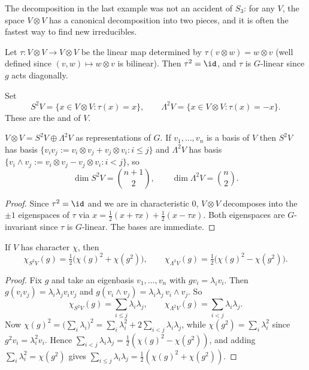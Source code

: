 The decomposition in the last example was not an accident of $S_3$: for any $V$, the space $V\otimes V$ has a canonical decomposition into two pieces, and it is often the fastest way to find new irreducibles.

Let $\tau : V\otimes V \to V\otimes V$ be the linear map determined by $\tau(v\otimes w) = w\otimes v$ (well defined since $(v,w)\mapsto w\otimes v$ is bilinear). Then $\tau^2 = \id$, and $\tau$ is $G$-linear since $g$ acts diagonally.

\begin{definition}
	Set
	$$S^2V = \{x \in V\otimes V : \tau(x) = x\}, \qquad \Lambda^2V = \{x\in V\otimes V: \tau(x) = -x\}.$$
	These are the  and  of $V$.
\end{definition}

\begin{proposition}
	$V \otimes V = S^2V\oplus\Lambda^2V$ as representations of $G$. If $v_1,\dots,v_n$ is a basis of $V$ then $S^2V$ has basis $\{v_iv_j := v_i\otimes v_j + v_j\otimes v_i : i\leq j\}$ and $\Lambda^2V$ has basis $\{v_i\wedge v_j := v_i\otimes v_j - v_j\otimes v_i : i<j\}$, so
	$$\dim S^2 V = \binom{n+1}2, \qquad \dim\Lambda^2V = \binom n2.$$
\end{proposition}
\begin{proof}
	Since $\tau^2 = \id$ and we are in characteristic $0$, $V\otimes V$ decomposes into the $\pm1$ eigenspaces of $\tau$ via $x = \frac12(x+\tau x) + \frac12(x - \tau x)$. Both eigenspaces are $G$-invariant since $\tau$ is $G$-linear. The bases are immediate.
\end{proof}

\begin{proposition}
	If $V$ has character $\chi$, then
	$$\chi_{S^2V}(g) = \tfrac12\big(\chi(g)^2 + \chi(g^2)\big), \qquad \chi_{\Lambda^2V}(g) = \tfrac12\big(\chi(g)^2 - \chi(g^2)\big).$$
\end{proposition}
\begin{proof}
	Fix $g$ and take an eigenbasis $v_1,\dots,v_n$ with $gv_i = \lambda_i v_i$. Then $g(v_iv_j) = \lambda_i\lambda_j v_iv_j$ and $g(v_i\wedge v_j) = \lambda_i\lambda_j\, v_i\wedge v_j$. So
	$$\chi_{S^2V}(g) = \sum_{i\leq j}\lambda_i\lambda_j, \qquad \chi_{\Lambda^2V}(g) = \sum_{i<j}\lambda_i\lambda_j.$$
	Now $\chi(g)^2 = \big(\sum_i\lambda_i\big)^2 = \sum_i\lambda_i^2 + 2\sum_{i<j}\lambda_i\lambda_j$, while $\chi(g^2) = \sum_i\lambda_i^2$ since $g^2 v_i = \lambda_i^2v_i$. Hence $\sum_{i<j}\lambda_i\lambda_j = \frac12(\chi(g)^2 - \chi(g^2))$, and adding $\sum_i\lambda_i^2 = \chi(g^2)$ gives $\sum_{i\leq j}\lambda_i\lambda_j = \frac12(\chi(g)^2+\chi(g^2))$.
\end{proof}

